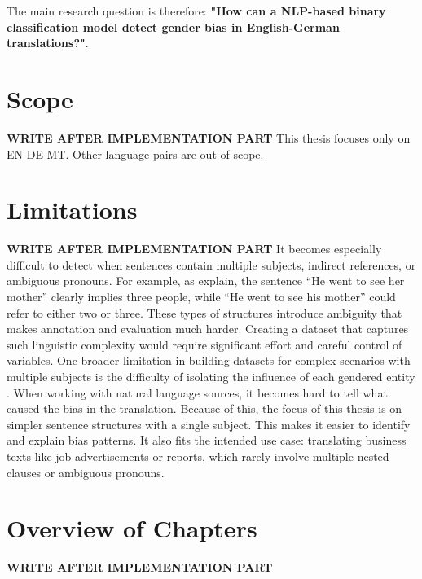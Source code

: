 The main research question is therefore: \textbf{"How can a NLP-based binary classification model detect gender bias in English-German translations?"}. 

\section{Scope}

\textbf{WRITE AFTER IMPLEMENTATION PART}
This thesis focuses only on EN-DE MT. Other language pairs are out of scope.

\section{Limitations}
\textbf{WRITE AFTER IMPLEMENTATION PART}
It becomes especially difficult to detect when sentences contain multiple subjects, indirect references, or ambiguous pronouns. For example, as \citet{barclayInvestigatingMarkersDrivers2024a} explain, the sentence “He went to see her mother” clearly implies three people, while “He went to see his mother” could refer to either two or three. These types of structures introduce ambiguity that makes annotation and evaluation much harder. Creating a dataset that captures such linguistic complexity would require significant effort and careful control of variables. One broader limitation in building datasets for complex scenarios with multiple subjects is the difficulty of isolating the influence of each gendered entity \citep{lardelliBuildingBridgesDataset2024}. When working with natural language sources, it becomes hard to tell what caused the bias in the translation. Because of this, the focus of this thesis is on simpler sentence structures with a single subject. This makes it easier to identify and explain bias patterns. It also fits the intended use case: translating business texts like job advertisements or reports, which rarely involve multiple nested clauses or ambiguous pronouns.
 

\section{Overview of Chapters}
\textbf{WRITE AFTER IMPLEMENTATION PART}
